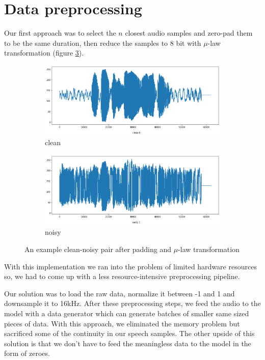 \documentclass{article}
\begin{document}
	

	\section{Data preprocessing}

	Our first approach was to select the $n$ closest audio samples and zero-pad them to be the same duration, then reduce the samples to 8 bit with $\mu$-law transformation (figure \ref{fig:clean_noisy_padded_mulaw}).
	
	\begin{figure}[H]
		\centering
		\begin{subfigure}{.5\textwidth}
			\centering
			\includegraphics[width=.8\linewidth]{wave_clean_padded_mulaw}
			\caption{clean}
			\label{fig:wave_clean_padded_mulaw}
		\end{subfigure}%
		\begin{subfigure}{.5\textwidth}
			\centering
			\includegraphics[width=.8\linewidth]{wave_noisy_padded_mulaw}
			\caption{noisy}
			\label{fig:wave_noisy_padded_mulaw}
		\end{subfigure}
		\caption{An example clean-noisy pair after padding and $\mu$-law transformation}
		\label{fig:clean_noisy_padded_mulaw}
	\end{figure}
	
	With this implementation we ran into the problem of limited hardware resources so, we had to come up with a less resource-intensive preprocessing pipeline.
	
	Our solution was to load the raw data, normalize it between -1 and 1 and downsample it to 16kHz. After these preprocessing steps, we feed the audio to the model with a data generator which can generate batches of smaller same sized pieces of data.
	With this approach, we eliminated the memory problem but sacrificed some of the continuity in our speech samples. The other upside of this solution is that we don't have to feed the meaningless data to the model in the form of zeroes.
	
\end{document}
